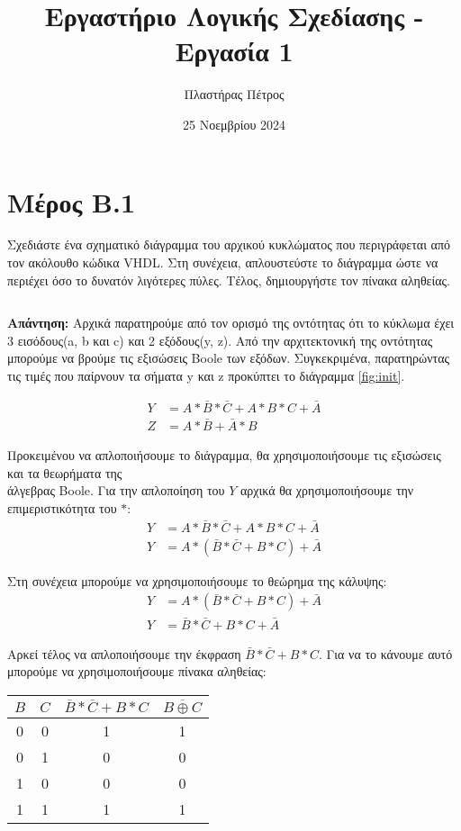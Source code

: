 \documentclass[draft]{article}
\begin{document}
\author{Πλαστήρας Πέτρος}
\title{Εργαστήριο Λογικής Σχεδίασης - Εργασία 1}
\date{25 Νοεμβρίου 2024}
\maketitle

\section{Μέρος Β.1}
Σχεδιάστε ένα σχηματικό διάγραμμα του αρχικού κυκλώματος που περιγράφεται από 
τον ακόλουθο κώδικα VHDL. Στη συνέχεια, απλουστεύστε το διάγραμμα ώστε να 
περιέχει όσο το δυνατόν λιγότερες πύλες. Τέλος, δημιουργήστε τον πίνακα αληθείας.

\inputminted{vhdl}{assign1_partB_1.vhdl}

\textbf{Απάντηση: } Αρχικά παρατηρούμε από τον ορισμό της οντότητας ότι το 
κύκλωμα έχει 3 εισόδους(a, b και c) και 2 εξόδους(y, z).
Από την αρχιτεκτονική της οντότητας μπορούμε να βρούμε τις εξισώσεις Boole των εξόδων.
Συγκεκριμένα, παρατηρώντας τις τιμές που παίρνουν τα σήματα y και z προκύπτει το διάγραμμα \ref{fig:init}.

\begin{align*}
  Y &= A * \bar{B} * \bar{C} + A * B * C + \bar{A} \\
  Z &= A * \bar{B} + \bar{A} * B
\end{align*}

Προκειμένου να απλοποιήσουμε το διάγραμμα, θα χρησιμοποιήσουμε τις εξισώσεις και τα θεωρήματα της\\
άλγεβρας Boole. Για την απλοποίηση του $Y$ αρχικά θα χρησιμοποιήσουμε την επιμεριστικότητα του $*$:
\begin{align*}
  Y &= A * \bar{B} * \bar{C} + A * B * C + \bar{A} \\
  Y &= A * (\bar{B} * \bar{C} + B * C) + \bar{A} 
\end{align*}

Στη συνέχεια μπορούμε να χρησιμοποιήσουμε το θεώρημα της κάλυψης:
\begin{align*}
  Y &= A * (\bar{B} * \bar{C} + B * C) + \bar{A} \\
  Y &= \bar{B} * \bar{C} + B * C + \bar{A} 
\end{align*}

Αρκεί τέλος να απλοποιήσουμε την έκφραση $\bar{B} * \bar{C} + B * C$. Για να το κάνουμε αυτό μπορούμε να χρησιμοποιήσουμε πίνακα αληθείας:
\begin{center}
  \begin{tabular} {|c|c|c|c|}
    \hline \rule{0pt}{11pt}$B$ & $C$ & $\bar{B} * \bar{C} + B * C$ & $\overline{B \oplus C}$\\
    \hline 0 & 0 & 1 & 1\\
           0 & 1 & 0 & 0\\
           1 & 0 & 0 & 0\\
           1 & 1 & 1 & 1\\
    \hline
  \end{tabular}
\end{center}
\end{document}
